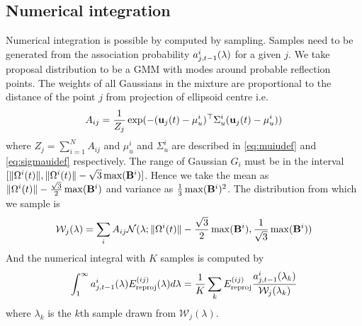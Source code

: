 \documentclass[10pt,twocolumn,letterpaper]{article}
\begin{document}
\subsection{Numerical integration}
Numerical integration is possible by computed by sampling. Samples need to be
generated from the association probability $a^{i}_{j,t-1}(\lambda)$ for a given $j$. We take
proposal distribution to be a GMM with modes around probable reflection points.
The weights of all Gaussians in the mixture are proportional to the distance of
the point $j$ from projection of ellipsoid centre i.e. 
\begin{align}
  A_{ij} = \frac{1}{Z_j}\exp(-(\mathbf{u}_j(t) - \mu^i_u)^\top\Sigma_u^i(\mathbf{u}_j(t) - \mu^i_u))
\end{align}
where $Z_j = \sum_{i=1}^N A_{ij}$ and $\mu^i_u$ and $\Sigma_u^i$ are described in \eqref{eq:muiudef} and \eqref{eq:sigmauidef} respectively.
The range of Gaussian $G_i$
must be in the interval $[\|\Omega^{i}(t)\|, \|\Omega^{i}(t)\| -
\sqrt{3}\max(\mathbf{B}^{i})]$. Hence we take the mean as $\|\Omega^{i}(t)\| -
\frac{\sqrt{3}}{2}\max(\mathbf{B}^{i})$ and variance as
$\frac{1}{3}\max(\mathbf{B}^{i})^2$. The distribution from which we sample is 
\newcommand{\Gauss}{\mathcal{N}}
\newcommand{\PropDist}{\mathcal{W}_j}
\begin{align}
  \PropDist(\lambda) = \sum_i A_{ij} \Gauss(\lambda; \|\relp{i}{t}\| -
  \frac{\sqrt{3}}{2}\max(\dimsn{i}), \frac{1}{\sqrt{3}}\max(\dimsn{i}))
\end{align}
And the numerical integral with $K$ samples is computed by
\begin{align}
    \int_1^{\infty}
    \assocP
    \Ereproj(\lambda)
    d\lambda
    =
    \frac{1}{K}\sum_k \Ereproj \frac{\assocPk}{\PropDist(\lambda_k)}
\end{align}
where $\lambda_k$ is the $k$th sample drawn from $\PropDist(\lambda)$.
\end{document}
